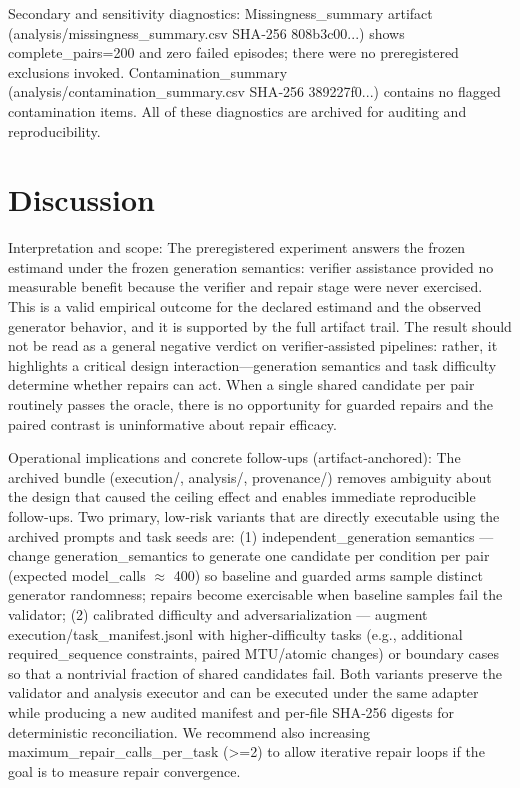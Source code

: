 \documentclass[conference]{IEEEtran}
\begin{document}
Secondary and sensitivity diagnostics: Missingness\_summary artifact (analysis/missingness\_summary.csv SHA‑256 808b3c00...) shows complete\_pairs=200 and zero failed episodes; there were no preregistered exclusions invoked. Contamination\_summary (analysis/contamination\_summary.csv SHA‑256 389227f0...) contains no flagged contamination items. All of these diagnostics are archived for auditing and reproducibility.

\section{Discussion}
Interpretation and scope: The preregistered experiment answers the frozen estimand under the frozen generation semantics: verifier assistance provided no measurable benefit because the verifier and repair stage were never exercised. This is a valid empirical outcome for the declared estimand and the observed generator behavior, and it is supported by the full artifact trail. The result should not be read as a general negative verdict on verifier‑assisted pipelines: rather, it highlights a critical design interaction---generation semantics and task difficulty determine whether repairs can act. When a single shared candidate per pair routinely passes the oracle, there is no opportunity for guarded repairs and the paired contrast is uninformative about repair efficacy.

Operational implications and concrete follow‑ups (artifact‑anchored): The archived bundle (execution/, analysis/, provenance/) removes ambiguity about the design that caused the ceiling effect and enables immediate reproducible follow‑ups. Two primary, low‑risk variants that are directly executable using the archived prompts and task seeds are: (1) independent\_generation semantics --- change generation\_semantics to generate one candidate per condition per pair (expected model\_calls \ensuremath{\approx} 400) so baseline and guarded arms sample distinct generator randomness; repairs become exercisable when baseline samples fail the validator; (2) calibrated difficulty and adversarialization --- augment execution/task\_manifest.jsonl with higher‑difficulty tasks (e.g., additional required\_sequence constraints, paired MTU/atomic changes) or boundary cases so that a nontrivial fraction of shared candidates fail. Both variants preserve the validator and analysis executor and can be executed under the same adapter while producing a new audited manifest and per‑file SHA‑256 digests for deterministic reconciliation. We recommend also increasing maximum\_repair\_calls\_per\_task (>=2) to allow iterative repair loops if the goal is to measure repair convergence.
\end{document}
